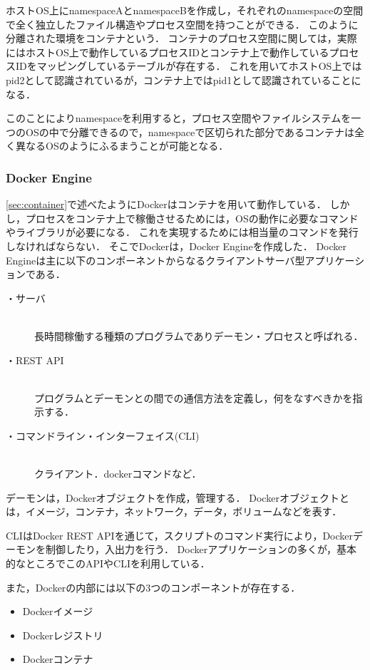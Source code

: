 ホストOS上にnamespaceAとnamespaceBを作成し，それぞれのnamespaceの空間で全く独立したファイル構造やプロセス空間を持つことができる．
このように分離された環境をコンテナという．
コンテナのプロセス空間に関しては，実際にはホストOS上で動作しているプロセスIDとコンテナ上で動作しているプロセスIDをマッピングしているテーブルが存在する．
これを用いてホストOS上ではpid2として認識されているが，コンテナ上ではpid1として認識されていることになる．

このことによりnamespaceを利用すると，プロセス空間やファイルシステムを一つのOSの中で分離できるので，namespaceで区切られた部分であるコンテナは全く異なるOSのようにふるまうことが可能となる．

\subsubsection{Docker Engine}
\ref{sec:container}で述べたようにDockerはコンテナを用いて動作している．
しかし，プロセスをコンテナ上で稼働させるためには，OSの動作に必要なコマンドやライブラリが必要になる．
これを実現するためには相当量のコマンドを発行しなければならない．
そこでDockerは，Docker Engineを作成した．
Docker Engineは主に以下のコンポーネントからなるクライアントサーバ型アプリケーションである．

\begin{description}
    \item[・サーバ]\mbox{}\\
        長時間稼働する種類のプログラムでありデーモン・プロセスと呼ばれる．
    \item[・REST API]\mbox{}\\
        プログラムとデーモンとの間での通信方法を定義し，何をなすべきかを指示する．
    \item[・コマンドライン・インターフェイス(CLI)]\mbox{}\\
        クライアント．dockerコマンドなど．
\end{description}

デーモンは，Dockerオブジェクトを作成，管理する．
Dockerオブジェクトとは，イメージ，コンテナ，ネットワーク，データ，ボリュームなどを表す．

CLIはDocker REST APIを通じて，スクリプトのコマンド実行により，Dockerデーモンを制御したり，入出力を行う．
Dockerアプリケーションの多くが，基本的なところでこのAPIやCLIを利用している．

また，Dockerの内部には以下の3つのコンポーネントが存在する．

\begin{itemize}
    \item Dockerイメージ
    \item Dockerレジストリ
    \item Dockerコンテナ
\end{itemize}

